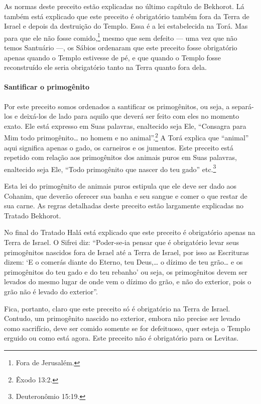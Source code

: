 As normas deste preceito estão explicadas no último capítulo de Bekhorot. Lá também está explicado que este preceito é obrigatório também
fora da Terra de Israel e depois da destruição do Templo. Essa é a lei
estabelecida na Torá. Mas para que ele não fosse comido,\footnote{Fora de Jerusalém.} mesmo
que sem defeito ---
uma vez que não temos Santuário ---, os Sábios ordenaram que este
preceito fosse obrigatório apenas quando o Templo estivesse de pé, e que quando o
Templo fosse reconstruído ele seria obrigatório tanto na Terra quanto
fora dela.

\paragraph{Santificar o primogênito}

Por este preceito somos ordenados a santificar os primogênitos, ou seja,
a separá-los e deixá-los de lado para aquilo que deverá ser feito com
eles no momento exato. Ele está expresso em Suas palavras, enaltecido
seja Ele, ``Consagra para Mim todo primogênito\ldots{} no homem e no
animal''.\footnote{Êxodo 13:2.} A Torá explica que ``animal'' aqui significa
apenas o gado, os carneiros e os jumentos. Este preceito está repetido
com relação aos primogênitos dos animais puros em Suas palavras,
enaltecido seja Ele, ``Todo primogênito que nascer do teu gado'' etc.\footnote{Deuteronômio 15:19.}

Esta lei do primogênito de animais puros estipula que ele deve ser dado
aos Cohanim, que deverão oferecer sua banha e seu sangue e comer
o que restar de sua carne. As regras detalhadas deste preceito estão
largamente explicadas no Tratado Bekhorot.

No final do Tratado Halá está explicado que este preceito é obrigatório
apenas na Terra de Israel. O Sifrei diz: ``Poder-se-ia pensar que é
obrigatório levar seus primogênitos nascidos fora de Israel até a Terra
de Israel, por isso as Escrituras dizem: `E o comerás diante do Eterno,
teu Deus,\ldots{} o dízimo de teu grão\ldots{} e os primogênitos do teu gado e do %
teu rebanho' ou seja, os primogênitos devem ser levados do mesmo lugar
de onde vem o dízimo do grão, e não do exterior, pois o grão não é
levado do exterior''.

Fica, portanto, claro que este preceito só é obrigatório na Terra de
Israel. Contudo, um primogênito nascido no exterior, embora não precise
ser levado como sacrifício, deve ser comido somente se for defeituoso,
quer esteja o Templo erguido ou como está agora. Este preceito não é
obrigatório para os Levitas.

